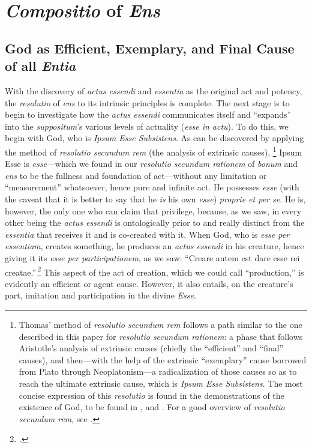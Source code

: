 \section{\emph{Compositio} of \emph{Ens}}

\subsection{God as Efficient, Exemplary, and Final Cause of all \emph{Entia}}

With the discovery of \emph{actus essendi} and \emph{essentia} as the original act and potency, the \emph{resolutio} of \emph{ens} to its intrinsic principles is complete. The next stage is to begin to investigate how the \emph{actus essendi} communicates itself and “expands” into the \emph{suppositum}’s various levels of actuality (\emph{esse in actu}). To do this, we begin with God, who is \emph{Ipsum Esse Subsistens}. As can be discovered by applying the method of \emph{resolutio secundum rem} (the analysis of extrinsic causes),%
%
\footnote{Thomas’ method of \emph{resolutio secundum rem} follows a path similar to the one described in this paper for \emph{resolutio secundum rationem}: a phase that follows Aristotle’s analysis of extrinsic causes (chiefly the “efficient” and “final” causes), and then—with the help of the extrinsic “exemplary” cause borrowed from Plato through Neoplatonism—a radicalization of those causes so as to reach the ultimate extrinsic cause, which is \emph{Ipsum Esse Subsistens}. The most concise expression of this \emph{resolutio} is found in the demonstrations of the existence of God, to be found in \cite[I, q.~2, a.~3]{st:summa}, and \cite[I, cap.~13]{st:contragent}. For a good overview of \emph{resolutio secundum rem}, see \cite{mitchell:resolutio-secundum-rem}.}
%
Ipsum Esse is \emph{esse}—which we found in our \emph{resolutio secundum rationem} of \emph{bonum} and \emph{ens} to be the fullness and foundation of act—without any limitation or “measurement” whatsoever, hence pure and infinite act. He possesses \emph{esse} (with the caveat that it is better to say that he \emph{is} his own \emph{esse}) \emph{proprie et per se}. He is, however, the only one who can claim that privilege, because, as we saw, in every other being the \emph{actus essendi} is ontologically prior to and really distinct from the \emph{essentia} that receives it and is co-created with it. When God, who is \emph{esse per essentiam}, creates something, he produces an \emph{actus essendi} in his creature, hence giving it its \emph{esse per participationem}, as we saw: “Creare autem est dare esse rei creatae.”\,\footcite[cap.~1, lc.~5, n.~133]{st:superio} This aspect of the act of creation, which we could call “production,” is evidently an efficient or agent cause. However, it also entails, on the creature’s part, imitation and participation in the divine \emph{Esse}.

